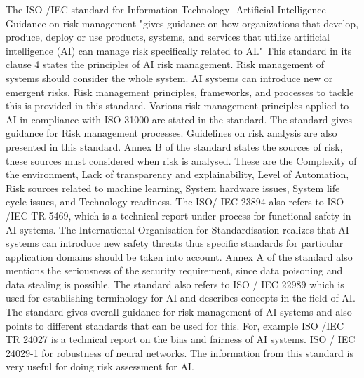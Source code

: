 {The ISO /IEC standard for Information Technology -Artificial Intelligence -Guidance on risk management "gives guidance on how organizations that develop, produce, deploy or use products, systems, and services that utilize artificial intelligence (AI) can manage risk specifically related to AI."\cite{author12} This standard in its clause 4  states the principles of AI risk management. Risk management of systems should consider the whole system. AI systems can introduce new or emergent risks. Risk management principles, frameworks, and processes to tackle this is provided in this standard.
Various risk management principles applied to AI in compliance with ISO 31000 are stated in the standard. The standard gives guidance for Risk management processes. Guidelines on risk analysis are also presented in this standard. Annex B of the standard states the sources of risk, these sources must considered when risk is analysed. These are the Complexity of the environment, Lack of transparency and explainability, Level of Automation, Risk sources related to machine learning, System hardware issues, System life cycle issues, and Technology readiness. The ISO/ IEC 23894 also refers to ISO /IEC TR 5469, which is a technical report under process for functional safety in AI systems. The International Organisation for Standardisation realizes that AI systems can introduce new safety threats thus specific standards for particular application domains should be taken into account. Annex A of the standard also mentions the seriousness of the security requirement, since data poisoning and data stealing is possible. The standard also refers to ISO / IEC 22989 which is used for establishing terminology for AI and describes concepts in the field of AI.
The standard gives overall guidance for risk management of AI systems and also points to different standards that can be used for this. For, example ISO /IEC TR 24027 is a technical report on the bias and fairness of AI systems. ISO / IEC 24029-1 for robustness of neural networks. The information from this standard is very useful for doing risk assessment for AI.


}
